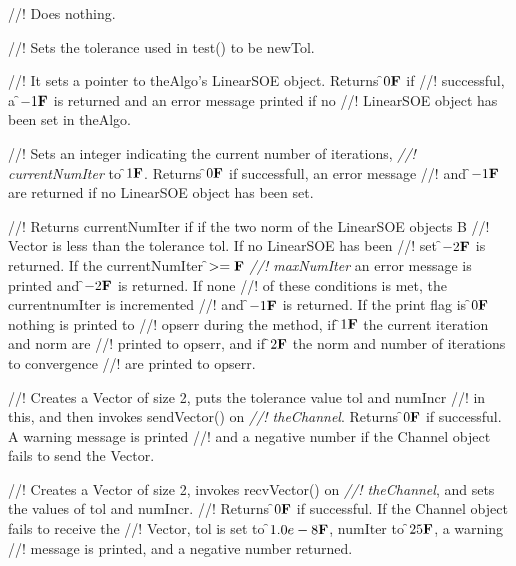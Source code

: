 //! Does nothing.

//! Sets the tolerance used in test() to be \p newTol.

//! It sets a pointer to \p theAlgo's LinearSOE object. Returns \f$0{\bf F}$ if
//! successful, a \f$-1{\bf F}$ is returned and an error message printed if no
//! LinearSOE object has been set in \p theAlgo.

//! Sets an integer indicating the current number of iterations, {\em
//! currentNumIter} to \f$1{\bf F}$. Returns \f$0{\bf F}$ if successfull, an error message
//! and \f$-1{\bf F}$ are returned if no LinearSOE object has been set. 

//! Returns {currentNumIter} if if the two norm of the LinearSOE objects B
//! Vector is less than the tolerance \p tol. If no LinearSOE has been
//! set \f$-2{\bf F}$ is returned. If the \p currentNumIter \f$>={\bf F}$ {\em
//! maxNumIter} an error message is printed and \f$-2{\bf F}$ is returned. If none
//! of these conditions is met, the \p currentnumIter is incremented 
//! and \f$-1{\bf F}$ is returned. If the print flag is \f$0{\bf F}$ nothing is printed to
//! opserr during the method, if \f$1{\bf F}$ the current iteration and norm are
//! printed to opserr, and if \f$2{\bf F}$ the norm and number of iterations to convergence
//! are printed to opserr. 


//! Creates a Vector of size 2, puts the tolerance value \p tol and \p numIncr
//! in this, and then invokes sendVector() on {\em
//! theChannel}. Returns \f$0{\bf F}$ if successful. A warning message is printed
//! and a negative number if the Channel object fails to send the Vector. 

//! Creates a Vector of size 2, invokes recvVector() on {\em
//! theChannel}, and sets the values of \p tol and \p numIncr.
//! Returns \f$0{\bf F}$ if successful. If the Channel object fails to receive the
//! Vector, \p tol is set to \f$1.0e-8{\bf F}$, \p numIter to \f$25{\bf F}$, a warning
//! message is printed, and a negative number returned.
